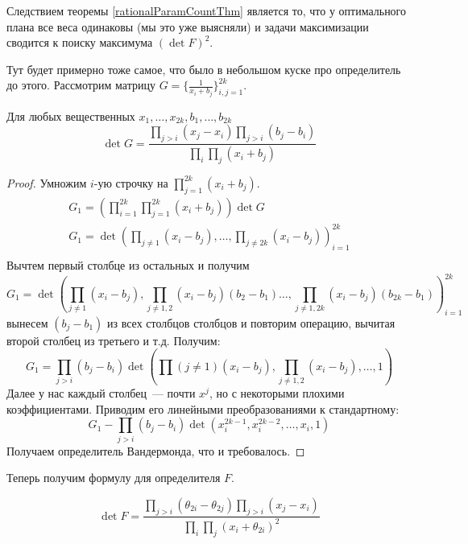 Следствием теоремы \eqref{rationalParamCountThm} является то, что у оптимального плана все веса одинаковы (мы это уже выясняли) и задачи максимизации сводится к поиску максимума $(\det F)^2$.

{\color{blue} Тут будет примерно тоже самое, что было в небольшом куске про определитель до этого.}
Рассмотрим матрицу $G = \{ \frac{1}{x_i + b_j}\}_{i,j = 1}^{2k}$. 
\begin{thm}
Для любых вещественных $x_1, …, x_{2k}, b_1,…, b_{2k}$
$$\det G = \frac{\prod\limits_{j>i} (x_j-x_i) \prod\limits_{j>i}(b_j - b_i)}{\prod\limits_i\prod\limits_j (x_i + b_j)}$$
\end{thm}
\begin{proof}
Умножим $i$-ую строчку на $\prod\limits_{j=1}^{2k}(x_i+b_j)$. 
\begin{equation}
\begin{split}
G_1 = (\prod\limits_{i=1}^{2k}\prod\limits_{j=1}^{2k}(x_i+b_j)) \det G \\
G_1 = \det\left( \prod\limits_{j\neq 1} (x_i-b_j), …, \prod\limits_{j\neq 2k} (x_i-b_j)\right)_{i=1}^{2k}\\
\end{split}
\end{equation}
Вычтем первый столбце из остальных и получим
$$G_1 = \det\left( \prod\limits_{j\neq 1} (x_i-b_j),\prod\limits_{j\neq 1,2} (x_i-b_j) (b_2 - b_1) …, \prod\limits_{j\neq 1, 2k} (x_i-b_j) (b_{2k} - b_1)\right)_{i=1}^{2k}$$
вынесем $(b_j-b_1)$ из всех столбцов столбцов и повторим операцию, вычитая второй столбец из третьего и т.д. Получим:
$$G_1 = \prod\limits_{j>i}(b_j - b_i) \det \left(\prod(j\neq 1)(x_i - b_j), \prod\limits_{j\neq 1,2}(x_i-b_j),…,1\right)$$ 
Далее у нас каждый столбец — почти $x^j$, но с некоторыми плохими коэффициентами. Приводим его линейными преобразованиями к стандартному:
$$G_1 - \prod \limits_{j>i}(b_j - b_i) \det(x_i^{2k-1}, x_i^{2k-2},…, x_i,1)$$
Получаем определитель Вандермонда, что и требовалось.
\end{proof}

Теперь получим формулу для определителя $F$.
\begin{thm}
\begin{equation}
\label{detEquatin}
\det F = \frac{\prod\limits_{j>i}(\theta_{2i}-\theta_{2j})\prod\limits_{j>i}(x_j - x_i)}{\prod\limits_i\prod\limits_j (x_i + \theta_{2i})^2}
\end{equation}
\end{thm}

